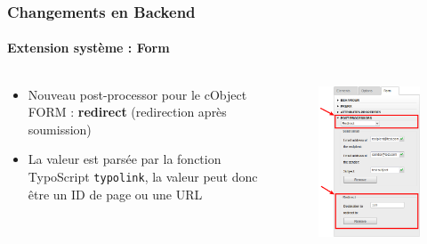 \begin{frame}[fragile]
	\frametitle{Changements en Backend}
	\framesubtitle{Extension système : Form}

	\begin{columns}[T]

		\begin{column}{.5\textwidth}
			\begin{itemize}
				\item Nouveau post-processor pour le cObject FORM : \textbf{redirect}\newline
					(redirection après soumission)\newline
				\item La valeur est parsée par la fonction TypoScript \texttt{typolink},\newline
					la valeur peut donc être un ID de page ou une URL
			\end{itemize}
		\end{column}

		\begin{column}{.5\textwidth}
			\begin{figure}\vspace*{-0.4cm}
				\includegraphics[width=0.65\linewidth]{Images/BackendChanges/FormRedirectPostProcessor.png}
			\end{figure}
		\end{column}

	\end{columns}
\end{frame}

